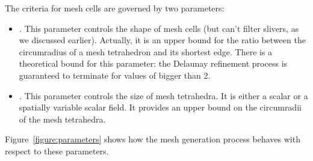 The criteria for mesh cells are governed by two parameters:
\begin{itemize}
\item \emph{.}   This parameter controls the
  shape of mesh cells (but can't filter slivers, as we discussed earlier).
 Actually, it is an upper bound for the ratio
 between the circumradius of a 
   mesh tetrahedron and its shortest edge.
There is a theoretical bound for this parameter:
the Delaunay refinement process is guaranteed to terminate
for values of   bigger than 2.
\item \emph{.}
This parameter controls the size of mesh tetrahedra.
It is either a scalar or a spatially variable scalar field.
  It provides an upper bound on the circumradii of the
 mesh tetrahedra. 
\end{itemize}

Figure~\ref{figure:parameters} shows how the mesh generation process
behaves with respect to these parameters.

